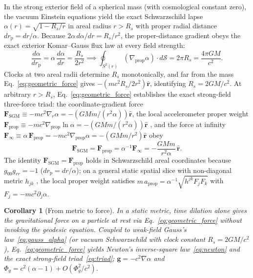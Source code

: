 \documentclass[aps,prd,onecolumn,tightenlines,nofootinbib,notitlepage,10pt,floatfix]{revtex4-2}
\theoremstyle{indentedtheorem}
\newtheorem{corollary}{Corollary}
\begin{document}
In the strong exterior field of a spherical mass (with cosmological constant zero), the vacuum Einstein equations yield the exact Schwarzschild lapse $\alpha(r)=\sqrt{1-R_s/r}$ in areal radius $r>R_s$ with proper radial distance $dr_\text{p}=dr/\alpha$. Because $2\alpha\,d\alpha/dr=R_s/r^2$, the proper-distance gradient obeys the exact exterior Komar--Gauss flux law at every field strength:
\begin{equation}
    \frac{d\alpha}{dr_\text{p}} = \alpha\,\frac{d\alpha}{dr} = \frac{R_s}{2r^2} \implies \oint_{S^2(r)}(\nabla_\text{prop}\alpha)\cdot d\boldsymbol{\mathcal{S}} = 2\pi R_s = \frac{4\pi GM}{c^2} .
    \label{eq:gauss_exact}
\end{equation}
Clocks at two areal radii determine $R_s$ monotonically, and far from the mass Eq.~\eqref{eq:geometric_force} gives $-(mc^2 R_s/2r^2)\hat{\mathbf{r}}$, identifying $R_s=2GM/c^2$. At arbitrary $r>R_s$, Eq.~\eqref{eq:geometric_force} establishes the exact strong-field three-force triad: the coordinate-gradient force $\mathbf{F}_\text{SGM}\equiv -mc^2\nabla_r\alpha = -(GMm/(r^2\alpha))\hat{\mathbf{r}}$, the local accelerometer proper weight $\mathbf{F}_\text{prop}\equiv -mc^2\nabla_\text{prop}\ln\alpha = -(GMm/(r^2\alpha))\hat{\mathbf{r}}$ \citep{Wald1984General}, and the force at infinity $\mathbf{F}_\infty\equiv \alpha\,\mathbf{F}_\text{prop}=-mc^2\nabla_\text{prop}\alpha=-(GMm/r^2)\hat{\mathbf{r}}$ \citep{Wald1984General} obey
\begin{equation}
    \mathbf{F}_\text{SGM} = \mathbf{F}_\text{prop} = \alpha^{-1}\mathbf{F}_\infty = -\frac{GMm}{r^2\alpha}\,\hat{\mathbf{r}} .
    \label{eq:triad}
\end{equation}
The identity $\mathbf{F}_\text{SGM}=\mathbf{F}_\text{prop}$ holds in Schwarzschild areal coordinates because $g_{00}g_{rr}=-1$ ($dr_\text{p}=dr/\alpha$); on a general static spatial slice with non-diagonal metric $h_{jk}$ \citep{HutchisonWavefn2026}, the local proper weight satisfies $m\,a_\text{prop}=\alpha^{-1}\sqrt{h^{jk}F_j F_k}$ with $F_j=-mc^2\partial_j\alpha$.

\begin{corollary}[From metric to force]\label{cor:causal_gravity}
In a static metric, time dilation alone gives the gravitational force on a particle at rest via Eq.~\eqref{eq:geometric_force} without invoking the geodesic equation. Coupled to weak-field Gauss's law~\eqref{eq:gauss_alpha} (or vacuum Schwarzschild with clock constant $R_s=2GM/c^2$), Eq.~\eqref{eq:geometric_force} yields Newton's inverse-square law~\eqref{eq:newton} and the exact strong-field triad~\eqref{eq:triad}; $\mathbf{g}=-c^2\nabla\alpha$ and $\Phi_g=c^2(\alpha-1)+O(\Phi_g^2/c^2)$.
\end{corollary}
\end{document}
